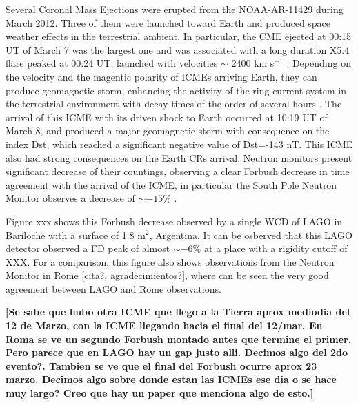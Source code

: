 Several Coronal Mass Ejections were erupted from the NOAA-AR-11429 during March 2012.
Three of them were launched toward Earth and produced space weather effects in the terrestrial ambient.
In particular, the CME ejected at 00:15 UT of March 7 was the largest one and was associated
with a long duration X5.4 flare peaked at 00:24 UT, launched with velocities $\sim$ 2400 km s$^{-1}$ \cite{Liu13}.
Depending on the velocity and the magentic polarity of ICMEs arriving Earth, they can produce geomagnetic storm,
enhancing the activity of the ring current system in the terrestrial environment
with decay times of the order of several hours \cite{Dasso02}.
The arrival of this ICME with its driven shock to Earth occurred at 10:19 UT of March 8,
and produced a major geomagnetic storm with consequence on the index Dst,
which reached a significant negative value of Dst=-143 nT.
This ICME also had strong consequences on the Earth CRs arrival. Neutron monitors present significant decrease
of their countings, observing a clear Forbush decrease in time agreement with the arrival of the ICME,
in particular the South Pole Neutron Monitor observes a decrease of $\sim -15\%$ \cite{DiFino14}.


Figure xxx shows this Forbush decrease observed by a single WCD of LAGO in Bariloche with a surface of 1.8 m$^2$, Argentina.
It can be osberved that this LAGO detector observed a FD peak of almost $\sim - 6\%$ at a place with a rigidity cutoff of XXX.
For a comparison, this figure also shows observations from the Neutron Monitor in Rome [cita?, agradecimientos?], where can be
seen the very good agreement between LAGO and Rome observations.

{\bf [Se sabe que hubo otra ICME que llego a la Tierra aprox mediodia del 12 de Marzo, con la ICME llegando hacia el final del 12/mar.
En Roma se ve un segundo Forbush montado antes que termine el primer. Pero parece que en LAGO hay un gap justo alli. Decimos algo del 2do evento?.
Tambien se ve que el final del Forbush ocurre aprox 23 marzo. Decimos algo sobre donde estan las ICMEs ese dia o se hace muy largo?
Creo que hay un paper que menciona algo de esto.]}

